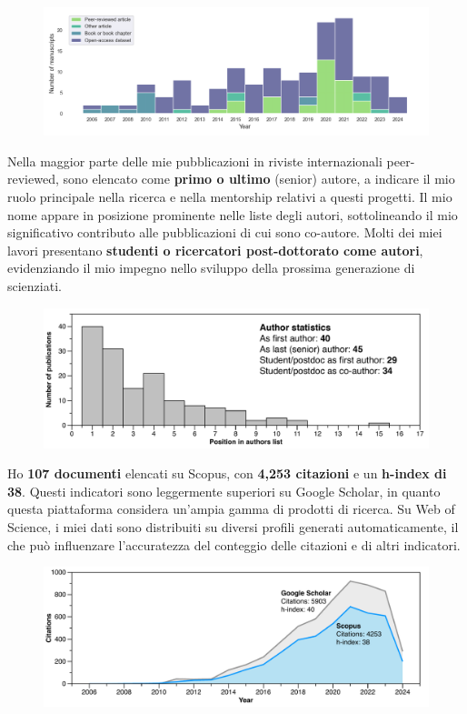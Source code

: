 \documentclass[11pt]{article}
\begin{document}
\begin{figure}[h]
\centering
\includegraphics[width=\textwidth]{img/products_per_year.png}
\end{figure}

{\normalfont Nella maggior parte delle mie pubblicazioni in riviste internazionali peer-reviewed, sono elencato come \textbf{primo o ultimo} (senior) autore, a indicare il mio ruolo principale nella ricerca e nella mentorship relativi a questi progetti. Il mio nome appare in posizione prominente nelle liste degli autori, sottolineando il mio significativo contributo alle pubblicazioni di cui sono co-autore. Molti dei miei lavori presentano \textbf{studenti o ricercatori post-dottorato come autori}, evidenziando il mio impegno nello sviluppo della prossima generazione di scienziati.}

\begin{figure}[h]
\centering
\includegraphics[width=\textwidth]{img/Manuscripts.pdf}
\end{figure}

{\normalfont Ho \textbf{107 documenti} elencati su Scopus, con \textbf{4,253 citazioni} e un \textbf{h-index di 38}. Questi indicatori sono leggermente superiori su Google Scholar, in quanto questa piattaforma considera un'ampia gamma di prodotti di ricerca. Su Web of Science, i miei dati sono distribuiti su diversi profili generati automaticamente, il che può influenzare l'accuratezza del conteggio delle citazioni e di altri indicatori.}

\begin{figure}[h]
\centering
\includegraphics[width=\textwidth]{img/CITATIONS.pdf}
\end{figure}
\end{document}
